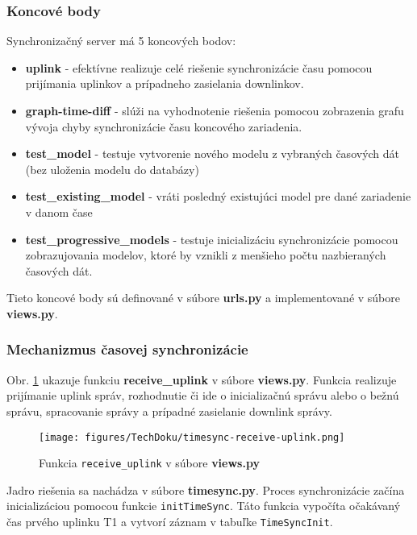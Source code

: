\subsubsection{Koncové body}

Synchronizačný server má 5 koncových bodov:

\begin{itemize}
    \item \textbf{uplink} - efektívne realizuje celé riešenie synchronizácie času pomocou prijímania uplinkov a prípadneho zasielania downlinkov.
    \item \textbf{graph-time-diff} -  slúži na vyhodnotenie riešenia pomocou zobrazenia grafu vývoja chyby synchronizácie času koncového zariadenia.
    \item \textbf{test_model} - testuje vytvorenie nového modelu z vybraných časových dát (bez uloženia modelu do databázy)
    \item \textbf{test_existing_model} - vráti posledný existujúci model pre dané zariadenie v danom čase
    \item \textbf{test_progressive_models} - testuje inicializáciu synchronizácie pomocou zobrazujovania modelov, ktoré by vznikli z menšieho počtu nazbieraných časových dát.
\end{itemize}

Tieto koncové body sú definované v súbore \textbf{urls.py} a implementované v súbore \textbf{views.py}.


\subsubsection{Mechanizmus časovej synchronizácie}

Obr. \ref{fig:tech:timesync-receive-uplink} ukazuje funkciu \textbf{receive\_uplink} v súbore \textbf{views.py}. Funkcia realizuje prijímanie uplink správ, rozhodnutie či ide o inicializačnú správu alebo o bežnú správu, spracovanie správy a prípadné zasielanie downlink správy.

\begin{figure}[!h]
    \centering
    \texttt{[image: figures/TechDoku/timesync-receive-uplink.png]}
    \caption{Funkcia \texttt{receive\_uplink} v súbore \textbf{views.py}}
    \label{fig:tech:timesync-receive-uplink}
\end{figure}

Jadro riešenia sa nachádza v súbore \textbf{timesync.py}. 
Proces synchronizácie začína inicializáciou pomocou funkcie \texttt{initTimeSync}. Táto funkcia vypočíta očakávaný čas prvého uplinku T1 a vytvorí záznam v tabuľke \texttt{TimeSyncInit}.


